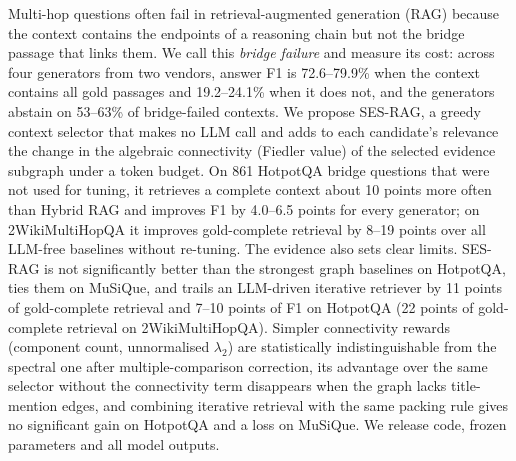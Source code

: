Multi-hop questions often fail in retrieval-augmented generation (RAG) because the context contains the endpoints of a reasoning chain but not the bridge passage that links them. We call this \emph{bridge failure} and measure its cost: across four generators from two vendors, answer F1 is 72.6--79.9\% when the context contains all gold passages and 19.2--24.1\% when it does not, and the generators abstain on 53--63\% of bridge-failed contexts. We propose SES-RAG, a greedy context selector that makes no LLM call and adds to each candidate's relevance the change in the algebraic connectivity (Fiedler value) of the selected evidence subgraph under a token budget. On 861 HotpotQA bridge questions that were not used for tuning, it retrieves a complete context about 10 points more often than Hybrid RAG and improves F1 by 4.0--6.5 points for every generator; on 2WikiMultiHopQA it improves gold-complete retrieval by 8--19 points over all LLM-free baselines without re-tuning. The evidence also sets clear limits. SES-RAG is not significantly better than the strongest graph baselines on HotpotQA, ties them on MuSiQue, and trails an LLM-driven iterative retriever by 11 points of gold-complete retrieval and 7--10 points of F1 on HotpotQA (22 points of gold-complete retrieval on 2WikiMultiHopQA). Simpler connectivity rewards (component count, unnormalised $\lambda_2$) are statistically indistinguishable from the spectral one after multiple-comparison correction, its advantage over the same selector without the connectivity term disappears when the graph lacks title-mention edges, and combining iterative retrieval with the same packing rule gives no significant gain on HotpotQA and a loss on MuSiQue. We release code, frozen parameters and all model outputs.
